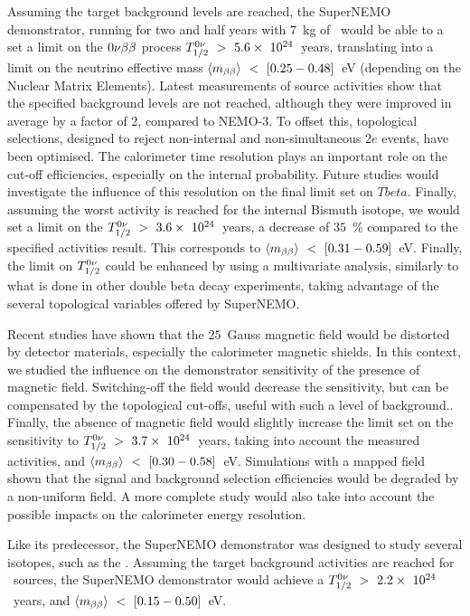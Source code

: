 Assuming the target background levels are reached, the SuperNEMO demonstrator, running for two and half years with $7$~kg of \Se\ would be able to a set a limit on the $0\nu\beta\beta$ process $T_{1/2}^{0\nu}~>~5.6\times~10^{24}$~years, translating into a limit on the neutrino effective mass $\langle m_{\beta\beta}\rangle~<~[0.25-0.48]$~eV (depending on the Nuclear Matrix Elements).
Latest measurements of source activities show that the specified background levels are not reached, although they were improved in average by a factor of 2, compared to NEMO-$3$.
To offset this, topological selections, designed to reject non-internal and non-simultaneous $2e$ events, have been optimised.
The calorimeter time resolution plays an important role on the cut-off efficiencies, especially on the internal probability.
Future studies would investigate the influence of this resolution on the final limit set on $Tbeta$.
Finally, assuming the worst activity is reached for the internal Bismuth isotope, we would set a limit on the $T_{1/2}^{0\nu}~>~3.6\times~10^{24}$~years, a decrease of $35$~\% compared to the specified activities result.
This corresponds to $\langle m_{\beta\beta}\rangle~<~[0.31-0.59]$~eV.
Finally, the limit on $T_{1/2}^{0\nu}$ could be enhanced by using a multivariate analysis, similarly to what is done in other double beta decay experiments, taking advantage of the several topological variables offered by SuperNEMO.

Recent studies have shown that the $25$~Gauss magnetic field would be distorted by detector materials, especially the calorimeter magnetic shields.
In this context, we studied the influence on the demonstrator sensitivity of the presence of magnetic field.
Switching-off the field would decrease the sensitivity, but can be compensated by the topological cut-offs, useful with such a level of background..
Finally, the absence of magnetic field would slightly increase the limit set on the sensitivity to $T_{1/2}^{0\nu}~>~3.7\times~10^{24}$~years, taking into account the measured activities, and $\langle m_{\beta\beta}\rangle~<~[0.30-0.58]$~eV.
Simulations with a mapped field shown that the signal and background selection efficiencies would be degraded by a non-uniform field.
A more complete study would also take into account the possible impacts on the calorimeter energy resolution.

Like its predecessor, the SuperNEMO demonstrator was designed to study several isotopes, such as the \Nd.
Assuming the target background activities are reached for \Nd\ sources, the SuperNEMO demonstrator would achieve a $T_{1/2}^{0\nu}~>~2.2\times~10^{24}$~years, and $\langle m_{\beta\beta}\rangle~<~[0.15-0.50]$~eV.


